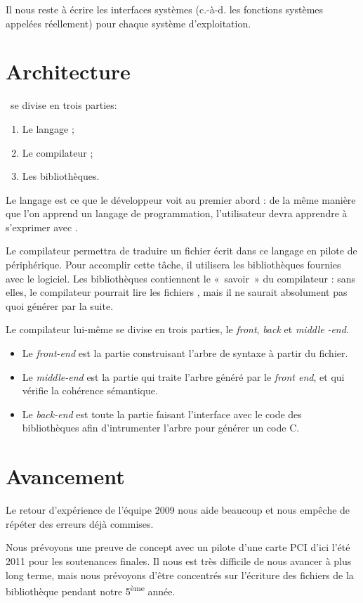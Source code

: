\documentclass[francais]{rtxreport}
\begin{document}
Il nous reste à écrire les interfaces systèmes (c.-à-d. les fonctions systèmes
appelées réellement) pour chaque système d’exploitation.

\section{Architecture}
\rtx\ se divise en trois parties:
\begin{enumerate}
	\item Le langage ;
	\item Le compilateur ;
	\item Les bibliothèques.
\end{enumerate}

Le langage est ce que le développeur voit au premier abord : de la même manière
que l’on apprend un langage de programmation, l’utilisateur devra apprendre à
s’exprimer avec \rtx.

Le compilateur permettra de traduire un fichier écrit dans ce langage en pilote
de périphérique. Pour accomplir cette tâche, il utilisera les bibliothèques
fournies avec le logiciel. Les bibliothèques contiennent le «~savoir~» du
compilateur : sans elles, le compilateur pourrait lire les fichiers \rtx, mais
il ne saurait absolument pas quoi générer par la suite.

Le compilateur lui-même se divise en trois parties, le \emph{front}, \emph{back}
et \emph{middle} \emph{-end}.

\begin{itemize}
	\item Le \emph{front-end} est la partie construisant l’arbre de syntaxe à
          partir du fichier.
	\item Le \emph{middle-end} est la partie qui traite l’arbre généré par
          le \emph{front end}, et qui vérifie la cohérence sémantique.
        \item Le \emph{back-end} est toute la partie faisant l'interface avec le
          code des bibliothèques afin d'intrumenter l'arbre pour générer un code
          C.
\end{itemize}

\section{Avancement}

Le retour d'expérience de l'équipe 2009 nous aide beaucoup et nous empêche de
répéter des erreurs déjà commises.

Nous prévoyons une preuve de concept avec un pilote d’une carte PCI d’ici l'été
2011 pour les soutenances finales. Il nous est très difficile de nous avancer à
plus long terme, mais nous prévoyons d’être concentrés sur l’écriture des
fichiers de la bibliothèque pendant notre 5\textsuperscript{ème} année.
\end{document}
